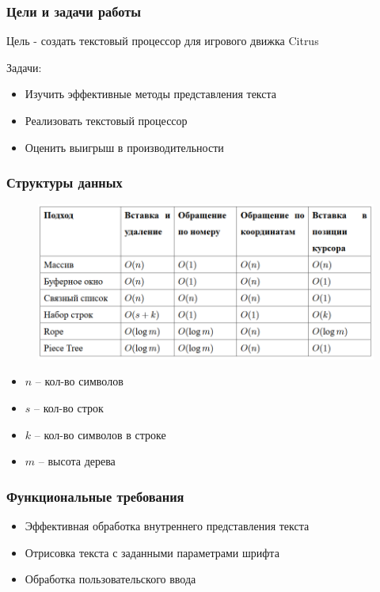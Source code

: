 \documentclass[10pt, unicode]{beamer}
\begin{document}
    \begin{frame}
        \frametitle{Цели и задачи работы}
        Цель - создать текстовый процессор для игрового движка Citrus
        \vspace{\baselineskip}

        Задачи:
        \begin{itemize}
            \item Изучить эффективные методы представления текста
            \item Реализовать текстовый процессор
            \item Оценить выигрыш в производительности
        \end{itemize}
    \end{frame}
    \begin{frame}
        \frametitle{Структуры данных}
        \begin{figure}
            \centering
            \includegraphics[width=\textwidth]{images/ComparisonTable.png}
        \end{figure}
        \begin{itemize}
            \item $n$ -- кол-во символов
            \item $s$ -- кол-во строк
            \item $k$ -- кол-во символов в строке
            \item $m$ -- высота дерева
        \end{itemize}
    \end{frame}
    \begin{frame}
        \frametitle{Функциональные требования}
        \begin{itemize}
            \item Эффективная обработка внутреннего представления текста
            \item Отрисовка текста с заданными параметрами шрифта
            \item Обработка пользовательского ввода
        \end{itemize}
    \end{frame}
\end{document}
